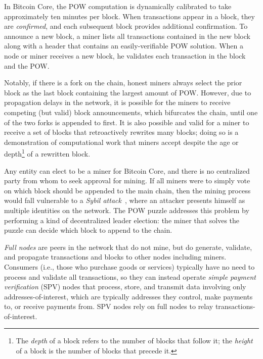 In Bitcoin Core, the POW computation is dynamically calibrated to take
approximately ten minutes per block. When transactions appear in a
block, they are \emph{confirmed}, and each subsequent block
provides additional confirmation. To announce a new block, a miner
lists all transactions contained in the new block along with a header
that contains an easily-verifiable POW solution. When a node or
miner receives a new block, he validates each transaction in the block
and the POW.

Notably, if there is a fork on the chain, honest miners always select the prior block as the last block containing the largest amount of POW. However, due to propagation delays in the network, it is possible for the
miners to receive competing (but valid) block announcements, which
bifurcates the chain, until one of the two forks is appended to
first. It is also possible and valid for a miner to receive a set of
blocks that retroactively rewrites many blocks; doing so is a
demonstration of computational work that miners accept despite the age
or depth\footnote{The \emph{depth} of a block refers to the number of blocks that follow it; the \emph{height} of a block is the number of
blocks that precede it.} of a rewritten block.


Any entity can elect to be a miner for Bitcoin Core, and there is no
centralized party from whom to seek approval for mining. If all miners
were to simply vote on which block should be appended to the main chain, then the mining process would fall vulnerable to a {\em Sybil
attack}~\cite{Douceur:2002}, where an attacker presents himself as multiple identities on the network. The POW puzzle addresses this
problem by performing a kind of decentralized leader election: the
miner that solves the puzzle can decide which block to append to the
chain.

 {\em Full nodes} are peers in the network that do not mine, but do
generate, validate, and propagate transactions and blocks to other
nodes including miners. Consumers (i.e., those who purchase goods or
services) typically have no need to process and validate all
transactions, so they can instead operate \emph{simple payment
  verification} (SPV) nodes that process, store, and transmit data
involving only addresses-of-interest, which are typically addresses
they control, make payments to, or receive payments from. SPV nodes
rely on full nodes to relay transactions-of-interest.

